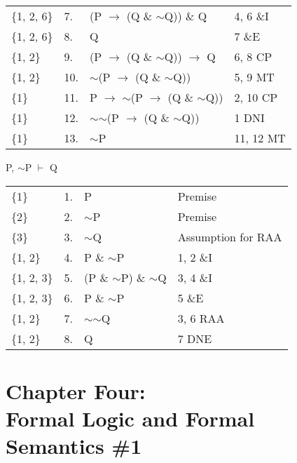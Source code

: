 \documentclass[a4paper,12pt]{article}
\newcommand{\mra}{$\rightarrow$ }
\newcommand{\ms}{$\sim$}
\newcommand{\mvd}{$\vdash$ }
\begin{document}
\begin{enumerate}[label=\arabic*,leftmargin=*]
\begin{enumerate}[label=(\roman*)]
\begin{minipage}{\textwidth}
\begin{tabular}{l l l l}
                        \{1, 2, 6\} & 7. & (P \mra (Q \& \ms Q)) \& Q & 4, 6 \&I\\
                        \{1, 2, 6\} & 8. & Q & 7 \&E\\
                        \{1, 2\} & 9. & (P \mra (Q \& \ms Q)) \mra Q & 6, 8 CP\\
                        \{1, 2\} & 10. & \ms (P \mra (Q \& \ms Q)) & 5, 9 MT\\
                        \{1\} & 11. & P \mra \ms (P \mra (Q \& \ms Q)) & 2, 10 CP\\
                        \{1\} & 12. & \ms \ms (P \mra (Q \& \ms Q)) & 1 DNI\\
                        \{1\} & 13. & \ms P & 11, 12 MT\\
                    \end{tabular}
                \end{minipage}

        \end{enumerate}

        \begin{minipage}{\textwidth}
        \item P, \ms P \mvd Q
            \vspace{1em}\\
            \begin{tabular}{l l l l}
                \{1\} & 1. & P & Premise\\
                \{2\} & 2. & \ms P & Premise\\
                \{3\} & 3. & \ms Q & Assumption for RAA\\
                \{1, 2\} & 4. & P \& \ms P & 1, 2 \&I\\
                \{1, 2, 3\} & 5. & (P \& \ms P) \& \ms Q & 3, 4 \&I\\
                \{1, 2, 3\} & 6. & P \& \ms P & 5 \&E\\
                \{1, 2\} & 7. & \ms \ms Q & 3, 6 RAA\\
                \{1, 2\} & 8. & Q & 7 DNE\\
            \end{tabular}
        \end{minipage}

    \end{enumerate}

    \newpage

    \section*{Chapter Four:\\Formal Logic and Formal Semantics \#1}
\end{document}
